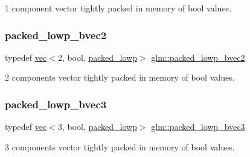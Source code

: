 1 component vector tightly packed in memory of bool values. 

\mbox{\label{group__gtc__type__aligned_gac3a7ad6d846a92b3e5d708cbb51b1f24}} 
\subsubsection{\texorpdfstring{packed\+\_\+lowp\+\_\+bvec2}{packed\_lowp\_bvec2}}
{\footnotesize\ttfamily typedef \mbox{\hyperlink{structglm_1_1vec}{vec}}$<$2, bool, \mbox{\hyperlink{namespaceglm_a36ed105b07c7746804d7fdc7cc90ff25ac36a4bd74559be2c0b65bc48e5953b8b}{packed\+\_\+lowp}}$>$ \mbox{\hyperlink{group__gtc__type__aligned_gac3a7ad6d846a92b3e5d708cbb51b1f24}{glm\+::packed\+\_\+lowp\+\_\+bvec2}}}



2 components vector tightly packed in memory of bool values. 

\mbox{\label{group__gtc__type__aligned_gae995413af4c773ede88dfa5b13a82fab}} 
\subsubsection{\texorpdfstring{packed\+\_\+lowp\+\_\+bvec3}{packed\_lowp\_bvec3}}
{\footnotesize\ttfamily typedef \mbox{\hyperlink{structglm_1_1vec}{vec}}$<$3, bool, \mbox{\hyperlink{namespaceglm_a36ed105b07c7746804d7fdc7cc90ff25ac36a4bd74559be2c0b65bc48e5953b8b}{packed\+\_\+lowp}}$>$ \mbox{\hyperlink{group__gtc__type__aligned_gae995413af4c773ede88dfa5b13a82fab}{glm\+::packed\+\_\+lowp\+\_\+bvec3}}}



3 components vector tightly packed in memory of bool values. 

\mbox{\label{group__gtc__type__aligned_ga7340a9bf8a974a263c6eaef48133331c}} 
